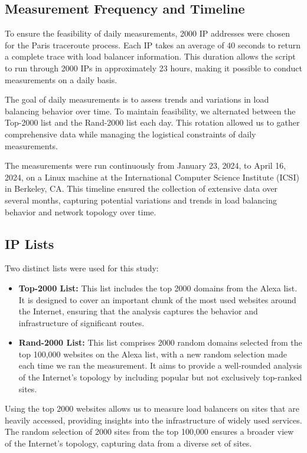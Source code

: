\documentclass[12pt]{cwru_thesis}
\begin{document}
\subsection{Measurement Frequency and Timeline}

To ensure the feasibility of daily measurements, 2000 IP addresses were chosen for the Paris traceroute process. Each IP takes an average of 40 seconds to return a complete trace with load balancer information. This duration allows the script to run through 2000 IPs in approximately 23 hours, making it possible to conduct measurements on a daily basis.

The goal of daily measurements is to assess trends and variations in load balancing behavior over time. To maintain feasibility, we alternated between the Top-2000 list and the Rand-2000 list each day. This rotation allowed us to gather comprehensive data while managing the logistical constraints of daily measurements.

The measurements were run continuously from January 23, 2024, to April 16, 2024, on a Linux machine at the International Computer Science Institute (ICSI) in Berkeley, CA. This timeline ensured the collection of extensive data over several months, capturing potential variations and trends in load balancing behavior and network topology over time.

\subsection{IP Lists}

Two distinct lists were used for this study:
\begin{itemize}
    \item \textbf{Top-2000 List:} This list includes the top 2000 domains from the Alexa list. It is designed to cover an important chunk of the most used websites around the Internet, ensuring that the analysis captures the behavior and infrastructure of significant routes.
    \item \textbf{Rand-2000 List:} This list comprises 2000 random domains selected from the top 100,000 websites on the Alexa list, with a new random selection made each time we ran the measurement. It aims to provide a well-rounded analysis of the Internet's topology by including popular but not exclusively top-ranked sites.
\end{itemize}

Using the top 2000 websites allows us to measure load balancers on sites that are heavily accessed, providing insights into the infrastructure of widely used services. The random selection of 2000 sites from the top 100,000 ensures a broader view of the Internet's topology, capturing data from a diverse set of sites.
\end{document}

